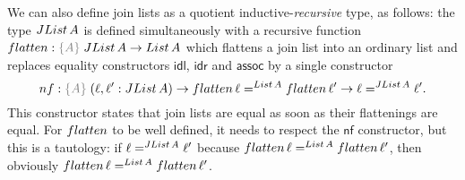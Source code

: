 \documentclass[a4paper,UKenglish,numberwithinsect,cleveref,thm-restate]{lipics-v2021}
\begin{document}
We can also define join lists as a quotient inductive-\emph{recursive} type, as follows: the type $\JList{A}$ is defined simultaneously with a recursive function $\flatten : \implicit{A}\;\JList{A} \to \List{A}$ which flattens a join list into an ordinary list and replaces equality constructors $\mathsf{idl}$, $\mathsf{idr}$ and $\mathsf{assoc}$ by a single constructor
\[
  \mathsf{nf} : \implicit{A}\;(\ell, \ell' : \JList{A}) \to \flatten\,\ell =^{\mathsf{List}\,A} \flatten\,\ell' \to \ell =^{\JList{A}} \ell'.
\]
This constructor states that join lists are equal as soon as their flattenings are equal. For $\flatten$ to be well defined, it needs to respect the $\mathsf{nf}$ constructor, but this is a tautology: if $\ell =^{\JList{A}} \ell'$ because $\flatten\,\ell =^{\mathsf{List}\,A} \flatten\,\ell'$, then obviously $\flatten\,\ell =^{\mathsf{List}\,A} \flatten\,\ell'$.

\end{document}
